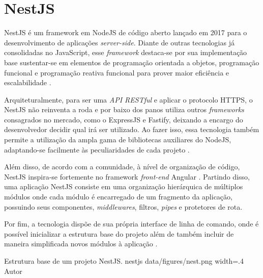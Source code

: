 \section{NestJS}
\label{sec:nestjs}
NestJS é um framework em NodeJS de código aberto lançado em 2017 para o desenvolvimento de aplicações \textit{server-side}. Diante de outras tecnologias já consolidadas no JavaScript, esse \textit{framework} destaca-se por sua implementação base sustentar-se em elementos de programação orientada a objetos, programação funcional e programação reativa funcional para prover maior eficiência e escalabilidade \cite{Mysliwiec2023b}.

Arquiteturalmente, para ser uma \textit{API RESTful} e aplicar o protocolo HTTPS, o NestJS não reinventa a roda e por baixo dos panos utiliza outros \textit{frameworks} consagrados no mercado, como o ExpressJS e Fastify, deixando a encargo do desenvolvedor decidir qual irá ser utilizado. Ao fazer isso, essa tecnologia também permite a utilização da ampla gama de bibliotecas auxiliares do NodeJS, adaptando-se facilmente às peculiaridades de cada projeto \cite{Mysliwiec2023}.

Além disso, de acordo com a comunidade, à nível de organização de código, NestJS inspira-se fortemente no framework \textit{front-end} Angular \cite{Passos2018}. Partindo disso, uma aplicação NestJS consiste em uma organização hierárquica de múltiplos módulos onde cada módulo é encarregado de um fragmento da aplicação, possuindo seus componentes, \textit{middlewares}, filtros, \textit{pipes} e protetores de rota.

Por fim, a tecnologia dispõe de sua própria interface de linha de comando, onde é possível inicializar a estrutura base do projeto além de também incluir de maneira simplificada novos módulos à aplicação \cite{Mysliwiec2023a}.

\image
    {Estrutura base de um projeto NestJS.}
    {nestjs}
    {data/figures/nest.png}
    {width=.4\textwidth}
    {Autor}